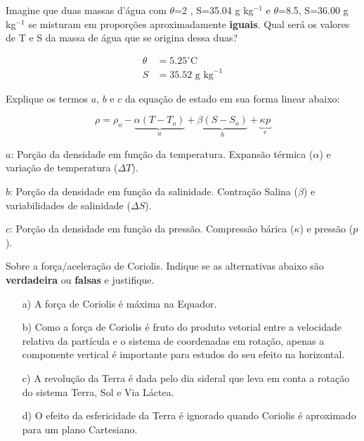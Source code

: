 \documentclass[letterpaper,portuguese,12pt,pdftex]{exam}
\begin{document}
\begin{questions}
\question[2\half]
Imagine que duas massas d'água com $\theta$=2 \textcelsius, S=35.04 g kg$^{-1}$ e
$\theta$=8.5\textcelsius, S=36.00 g kg$^{-1}$ se misturam em proporções
aproximadamente {\bf iguais}.  Qual será os valores de T e S da massa de água
que se origina dessa duas?

\begin{solution}
\begin{align*}
  \theta &= 5.25 ^\circ\text{C} \\
  S &= 35.52 \text{ g kg}^{-1}
\end{align*}
\end{solution}

\question[2\half]
  Explique os termos $a$, $b$ e $c$ da equação de estado em sua forma linear
  abaixo:

  \begin{equation}
    \rho = \rho_o - \underbrace{\alpha(T - T_o)}_{a} +
           \underbrace{\beta(S-S_o)}_b + \underbrace{\kappa p}_c
    \label{eq:linear}
  \end{equation}


  \begin{solution}
    $a$: Porção da densidade em função da temperatura. Expansão térmica
    ($\alpha$) e variação de temperatura ($\Delta T$).

    $b$: Porção da densidade em função da salinidade. Contração Salina
    ($\beta$) e variabilidades de salinidade ($\Delta S$).

    $c$: Porção da densidade em função da pressão. Compressão bárica ($\kappa$)
    e pressão ($p$).
  \end{solution}

\question[2\half]
Sobre a força/aceleração de Coriolis.  Indique se as alternativas abaixo são
{\bf verdadeira} ou {\bf falsas} e justifique.

\begin{itemize}
  \item[a)] A força de Coriolis é máxima na Equador.
  \item[b)] Como a força de Coriolis é fruto do produto vetorial entre a
            velocidade relativa da partícula e o sistema de coordenadas em
            rotação, apenas a componente vertical é importante para estudos do
            seu efeito na horizontal.
  \item[c)] A revolução da Terra é dada pelo dia sideral que leva em conta a
            rotação do sistema Terra, Sol e Via Láctea.
  \item[d)] O efeito da esfericidade da Terra é ignorado quando Coriolis é
            aproximado para um plano Cartesiano.
\end{itemize}


\end{questions}
\end{document}
